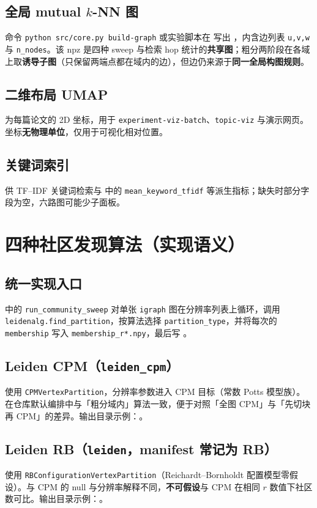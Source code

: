\documentclass[UTF8,a4paper,11pt,fontset=fandol]{ctexart}
\begin{document}
\subsection{全局 mutual $k$-NN 图}
命令 \texttt{python src/core.py build-graph} 或实验脚本在  写出 ，内含边列表 \texttt{u,v,w} 与 \texttt{n\_nodes}。该 npz 是四种 sweep 与检索 hop 统计的\textbf{共享图}；粗分两阶段在各域上取\textbf{诱导子图}（只保留两端点都在域内的边），但边仍来源于\textbf{同一全局构图规则}。

\subsection{二维布局 UMAP}
 为每篇论文的 2D 坐标，用于 \texttt{experiment-viz-batch}、\texttt{topic-viz} 与演示网页。坐标\textbf{无物理单位}，仅用于可视化相对位置。

\subsection{关键词索引}
 供 TF--IDF 关键词检索与  中的 \texttt{mean\_keyword\_tfidf} 等派生指标；缺失时部分字段为空，六路图可能少子面板。

\section{四种社区发现算法（实现语义）}

\subsection{统一实现入口}
 中的 \texttt{run\_community\_sweep} 对单张 \texttt{igraph} 图在分辨率列表上循环，调用 \texttt{leidenalg.find\_partition}，按算法选择 \texttt{partition\_type}，并将每次的 \texttt{membership} 写入 \texttt{membership\_r*.npy}，最后写 。

\subsection{Leiden CPM（\texttt{leiden\_cpm}）}
使用 \texttt{CPMVertexPartition}，分辨率参数进入 CPM 目标（常数 Potts 模型族）。在仓库默认编排中与「粗分域内」算法一致，便于对照「全图 CPM」与「先切块再 CPM」的差异。输出目录示例：。

\subsection{Leiden RB（\texttt{leiden}，manifest 常记为 RB）}
使用 \texttt{RBConfigurationVertexPartition}（Reichardt--Bornholdt 配置模型零假设）。与 CPM 的 null 与分辨率解释不同，\textbf{不可假设}与 CPM 在相同 $r$ 数值下社区数可比。输出目录示例：。
\end{document}
